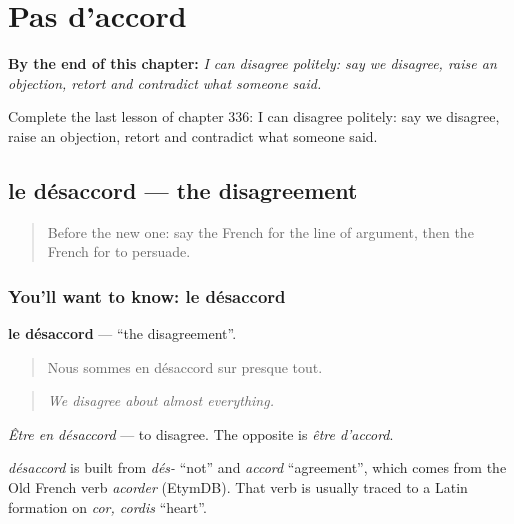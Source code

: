 
\chapter{Pas d'accord}
\label{ch:fr-pas-d-accord}

\begin{chapteropening}
\textbf{By the end of this chapter:} \emph{I can disagree politely: say we disagree, raise an objection, retort and contradict what someone said.}

Complete the last lesson of chapter 336: I can disagree politely: say we disagree, raise an objection, retort and contradict what someone said.
\end{chapteropening}

\section[le désaccord]{le désaccord — the disagreement}

\label{lesson:FR-C336-desaccord}



\begin{quote}
Before the new one: say the French for the line of argument, then the French for to persuade.
\end{quote}

\subsection*{You'll want to know: le désaccord}
\textbf{le désaccord} — \textquotedblleft{}the disagreement\textquotedblright{}.

\begin{quote}
Nous sommes en désaccord sur presque tout.
\end{quote}

\begin{quote}
\emph{We disagree about almost everything.}
\end{quote}

\emph{Être en désaccord} — to disagree. The opposite is \emph{être d'accord}.

\begin{cousinweb}
\emph{désaccord} is built from \emph{dés-} \textquotedblleft{}not\textquotedblright{} and \emph{accord} \textquotedblleft{}agreement\textquotedblright{}, which comes from the Old French verb \emph{acorder} (EtymDB). That verb is usually traced to a Latin formation on \emph{cor, cordis} \textquotedblleft{}heart\textquotedblright{}.
\end{cousinweb}

